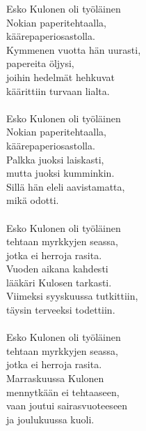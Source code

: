
            Esko Kulonen oli työläinen \\
            Nokian paperitehtaalla, \\
            käärepaperiosastolla. \\
            Kymmenen vuotta hän uurasti, \\
            papereita öljysi, \\
            joihin hedelmät hehkuvat \\
            käärittiin turvaan lialta. \\
\hspace{10mm} \\
            Esko Kulonen oli työläinen \\
            Nokian paperitehtaalla, \\
            käärepaperiosastolla. \\
            Palkka juoksi laiskasti, \\
            mutta juoksi kumminkin. \\
            Sillä hän eleli aavistamatta, \\
            mikä odotti. \\
\hspace{10mm} \\
            Esko Kulonen oli työläinen \\
            tehtaan myrkkyjen seassa, \\
            jotka ei herroja rasita. \\
            Vuoden aikana kahdesti \\
            lääkäri Kulosen tarkasti. \\
            Viimeksi syyskuussa tutkittiin, \\
            täysin terveeksi todettiin. \\
\hspace{10mm} \\
            Esko Kulonen oli työläinen \\
            tehtaan myrkkyjen seassa, \\
            jotka ei herroja rasita. \\
            Marraskuussa Kulonen \\
            mennytkään ei tehtaaseen, \\
            vaan joutui sairasvuoteeseen \\
            ja joulukuussa kuoli. \\
